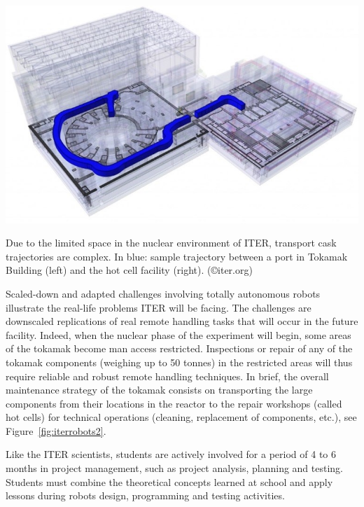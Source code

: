\begin{marginfigure}
	\centering
	\includegraphics[width=1.0\linewidth]{figures/chap5/ITER_Robots_2}
	\caption{Due to the limited space in the nuclear environment of ITER, transport cask trajectories are complex. In blue: sample trajectory between a port in Tokamak Building (left) and the hot cell facility (right). (©iter.org)}
	\label{fig:iterrobots2}
\end{marginfigure}

Scaled-down and adapted challenges involving totally autonomous robots illustrate the real-life problems ITER will be facing. The challenges are downscaled replications of real remote handling tasks that will occur in the future facility. Indeed, when the nuclear phase of the experiment will begin, some areas of the tokamak become man access restricted. Inspections or repair of any of the tokamak components (weighing up to 50 tonnes) in the restricted areas will thus require reliable and robust remote handling techniques. In brief, the overall maintenance strategy of the tokamak consists on transporting the large components from their locations in the reactor to the repair workshops (called hot cells) for technical operations (cleaning, replacement of components, etc.), see Figure~\ref{fig:iterrobots2}.

Like the ITER scientists, students are actively involved for a period of 4 to 6 months in project management, such as project analysis, planning and testing. Students must combine the theoretical concepts learned at school and apply lessons during robots design, programming and testing activities. 

